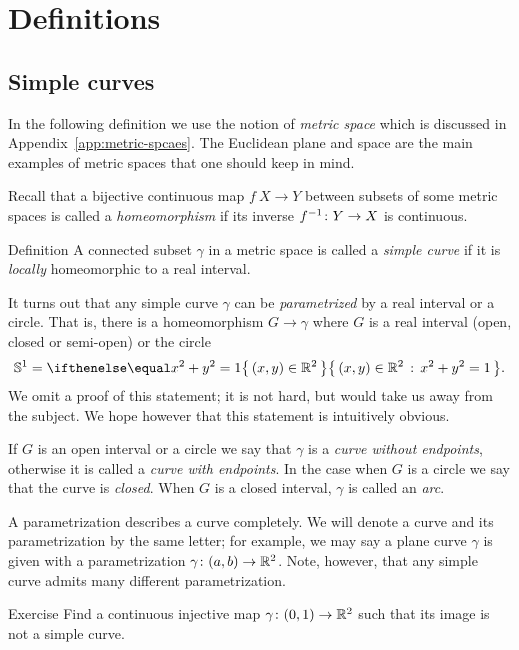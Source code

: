 \chapter{Definitions}


\section{Simple curves}

In the following definition we use the notion of \emph{metric space} which is discussed in Appendix~\ref{app:metric-spcaes}.
The Euclidean plane and space are the main examples of metric spaces that one should keep in mind. 

Recall that a bijective continuous map $f\:X\to Y$ between subsets of some metric spaces is called a \emph{homeomorphism} if its inverse $f^{-1}\:Y\z\to X$ is continuous.  

\begin{thm}{Definition} 
A connected subset $\gamma$ in a metric space is called a \emph{simple curve} if it is \emph{locally} homeomorphic to a real interval.
\end{thm}

It turns out that any simple curve $\gamma$ can be \emph{parametrized} by a real interval or a circle.
That is, there is a homeomorphism $G\to\gamma$ 
where $G$ is a real interval (open, closed or semi-open) or the circle
\[\SS^1=\set{(x,y)\in\RR^2}{x^2+y^2=1}.\]
We omit a proof of this statement; it is not hard, but would take us away from the subject.
We hope however that this statement is intuitively obvious. %

If $G$ is an open interval or a circle we say that $\gamma$ is a \emph{curve without endpoints}, otherwise it is 
called a \emph{curve with endpoints}. In the case when $G$ is a circle we say that the curve is \emph{closed}. 
When $G$ is a closed interval, $\gamma$ is called an \emph{arc}.


A parametrization describes a curve completely.
We will denote a curve and its parametrization by the same letter;
for example, we may say a plane curve $\gamma$ is given with a parametrization $\gamma\:(a,b)\z\to \RR^2$.
Note, however, that any simple curve admits many different parametrization. 

\begin{thm}{Exercise}\label{ex:9}
Find a continuous injective map $\gamma\colon(0,1)\to\mathbb{R}^2$ such that its image is not a simple curve.
\end{thm}


